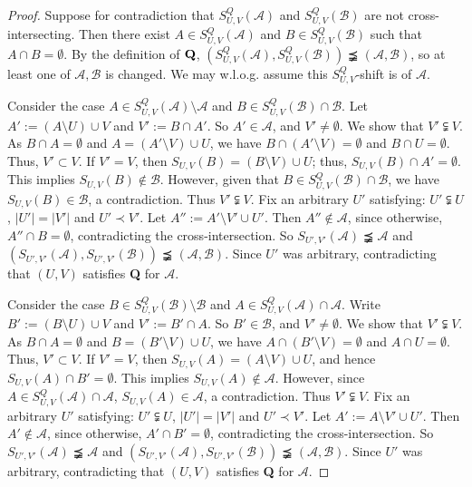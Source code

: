 \documentclass[11pt]{article}
\newcommand{\m}{\mathcal}
\begin{document}
\begin{proof}
Suppose for contradiction that \(S_{U,V}^{Q}(\mathcal{A})\) and \(S_{U,V}^{Q}(\mathcal{B})\) are not cross-intersecting.
Then there exist $A\in S_{U,V}^Q(\mathcal{A})$ and $B\in S_{U,V}^Q(\mathcal{B})$ such that $A\cap B=\emptyset$.
By the definition of $\bf Q$, $(S_{U,V}^Q(\mathcal{A}),S_{U,V}^Q(\mathcal{B}))\precneqq (\mathcal{A},\mathcal{B})$, so at least one of $\m A, \m B$ is changed. 
We may w.l.o.g. assume this $S_{U,V}^Q$-shift is of $\m A$.

Consider the case $A\in S_{U,V}^Q(\mathcal{A})\setminus \m A$ and $B\in S_{U,V}^Q(\mathcal{B})\cap \m B$. Let $A':=(A\setminus U )\cup V$ and $V':=B\cap A'$. So $A'\in \m A$, and $V' \ne \emptyset$. 
 We show that $V'\subsetneqq V$. 
As $B\cap A=\emptyset$ and $A=(A'\setminus V) \cup U$, we have
$B\cap (A'\setminus V)=\emptyset$ and $B\cap U=\emptyset$. Thus, $V'\subset V$. 
If $V'=V$, then $S_{U,V}(B)=(B\setminus V) \cup U$; thus, $S_{U,V}(B)\cap A'=\emptyset$. This implies $S_{U,V}(B)\not\in \m B$. 
However, given that $B\in S_{U,V}^Q(\mathcal{B})\cap \m B$, we have $S_{U,V}(B)\in \m B$, 
a contradiction. Thus  $V'\subsetneqq V$. 
Fix an arbitrary $U'$ satisfying: $U'\subsetneqq U$, $|U'|=|V'|$ and $U'\prec V'$. Let $A'':=A'\setminus V' \cup U'$. Then $A''\not\in \m A$, since otherwise, $A''\cap B=\emptyset$, contradicting the cross-intersection. So $S_{U',V'}(\mathcal{A})\precneqq \m A$ and $(S_{U',V'}(\m A), S_{U',V'}(\m B))\precneqq (\m A, \m B)$. Since $U'$ was arbitrary, contradicting that $(U,V)$ satisfies {\bf Q} for $\m A$.  

Consider the case $B\in S_{U,V}^Q(\mathcal{B})\setminus \m B$ and $A\in S_{U,V}^Q(\mathcal{A})\cap \m A$. Write $B':=(B\setminus U )\cup V$ and $V':=B'\cap A$. So $B'\in \m B$, and $V' \ne \emptyset$. 
We show that $V'\subsetneqq V$. 
As $B\cap A=\emptyset$ and $B=(B'\setminus V) \cup U$, we have
$A\cap (B'\setminus V)=\emptyset$ and $A\cap U=\emptyset$. Thus, $V'\subset V$. 
If $V'=V$, then $S_{U,V}(A)=(A\setminus V) \cup U$, and hence $S_{U,V}(A)\cap B'=\emptyset$. This implies $S_{U,V}(A)\not\in \m A$. 
However, since $A\in S_{U,V}^Q(\mathcal{A})\cap \m A$, $S_{U,V}(A)\in \m A$, 
a contradiction. Thus  $V'\subsetneqq V$. 
Fix an arbitrary $U'$ satisfying: $U'\subsetneqq U$, $|U'|=|V'|$ and $U'\prec V'$. Let $A':=A\setminus V' \cup U'$. Then $A'\not\in \m A$, since otherwise, $A'\cap B'=\emptyset$, contradicting the cross-intersection. So $S_{U',V'}(\mathcal{A})\precneqq \m A$ and $(S_{U',V'}(\m A), S_{U',V'}(\m B))\precneqq (\m A, \m B)$. Since $U'$ was arbitrary, contradicting that $(U,V)$ satisfies {\bf Q} for $\m A$. 
\end{proof}
\end{document}
